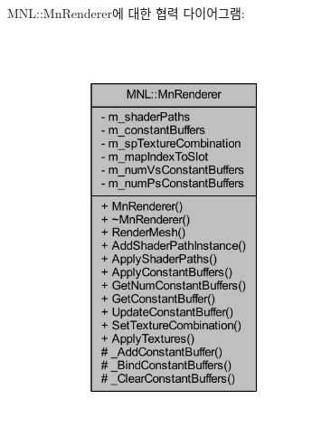 M\+NL\+:\+:Mn\+Renderer에 대한 협력 다이어그램\+:\nopagebreak
\begin{figure}[H]
\begin{center}
\leavevmode
\includegraphics[width=217pt]{class_m_n_l_1_1_mn_renderer__coll__graph}
\end{center}
\end{figure}
